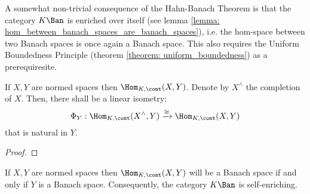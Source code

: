         A somewhat non-trivial consequence of the Hahn-Banach Theorem is that the category $K\-\Ban$ is enriched over itself (see lemma \ref{lemma: hom_between_banach_spaces_are_banach_spaces}), i.e. the hom-space between two Banach spaces is once again a Banach space. This also requires the Uniform Boundedness Principle (theorem \ref{theorem: uniform_boundedness}) as a prerequiresite. 
        \begin{lemma} \label{lemma: domain_completion}
            If $X, Y$ are normed spaces then $\Hom_{K, \cont}(X, Y)$. Denote by $X^{\wedge}$ the completion of $X$. Then, there shall be a linear isometry:
                $$\Phi_Y: \Hom_{K, \cont}(X^{\wedge}, Y) \xrightarrow[]{\cong} \Hom_{K, \cont}(X, Y)$$
            that is natural in $Y$.
        \end{lemma}
            \begin{proof}
            \end{proof}
        \begin{lemma} \label{lemma: hom_between_banach_spaces_are_banach_spaces}
            If $X, Y$ are normed spaces then $\Hom_{K, \cont}(X, Y)$ will be a Banach space if and only if $Y$ is a Banach space. Consequently, the category $K\-\Ban$ is self-enriching.
        \end{lemma}
